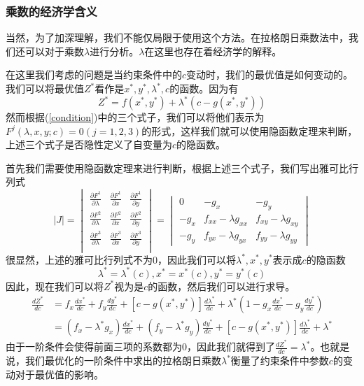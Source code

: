 \documentclass[UTF8,12pt]{ctexart}
\numberwithin{equation}{section} %
\numberwithin{figure}{section}
\numberwithin{table}{section}
\begin{document}
	\subsubsection{乘数的经济学含义}
	当然，为了加深理解，我们不能仅局限于使用这个方法。在拉格朗日乘数法中，我们还可以对于乘数$\lambda$进行分析。$\lambda$在这里也存在着经济学的解释。
	
	在这里我们考虑的问题是当约束条件中的$c$变动时，我们的最优值是如何变动的。我们可以将最优值$Z^*$看作是$x^*,y^*,\lambda^*,c$的函数。因为有
	\begin{equation}
		Z^* = f(x^*,y^*) + \lambda^*(c - g(x^*,y^*))
	\end{equation}
	然而根据(\ref{condition})中的三个式子，我们可以将他们表示为$F^{j}(\lambda,x,y;c) = 0(j = 1,2,3)$的形式，这样我们就可以使用隐函数定理来判断，上述三个式子是否隐性定义了自变量为$c$的隐函数。
	
	首先我们需要使用隐函数定理来进行判断，根据上述三个式子，我们写出雅可比行列式
	\begin{equation}
		|J|
		=
		\begin{vmatrix}
			\frac{\partial F^1}{\partial \lambda} & \frac{\partial F^1}{\partial x} & \frac{\partial F^1}{\partial y} \\
			\frac{\partial F^2}{\partial \lambda} & \frac{\partial F^2}{\partial x} & \frac{\partial F^2}{\partial y} \\
			\frac{\partial F^3}{\partial \lambda} & \frac{\partial F^3}{\partial x} & \frac{\partial F^3}{\partial y} \\
		\end{vmatrix}
		=
		\begin{vmatrix}
			0 & -g_x & -g_y \\
			-g_x  & f_{xx} - \lambda g_{xx} & f_{xy} - \lambda g_{xy} \\
			-g_y  & f_{yx} - \lambda g_{yx} & f_{yy} - \lambda g_{yy}
		\end{vmatrix}
	\end{equation}
	很显然，上述的雅可比行列式不为0，因此我们可以将$\lambda^*,x^*,y^*$表示成$c$的隐函数
	\begin{equation}
		\lambda^* = \lambda^*(c), x^* = x^*(c), y^* = y^*(c)
	\end{equation}
	因此，现在我们可以将$Z^*$视为是$c$的函数，然后我们可以进行求导。
	\begin{equation}
		\begin{aligned}
			\frac{dZ^*}{dc} &= f_x \frac{dx^*}{dc} + f_y \frac{dy^*}{dc} + [c - g(x^*,y^*)]\frac{d\lambda^*}{dc} + \lambda^*(1 - g_x\frac{dx^*}{dc} - g_y\frac{dy^*}{dc}) \\
			&=(f_x - \lambda^* g_x)\frac{dx^*}{dc} + (f_y - \lambda^* g_y)\frac{dy^*}{dc} + [c - g(x^*,y^*)]\frac{d\lambda^*}{dc} + \lambda^*
		\end{aligned}
	\end{equation}
	由于一阶条件会使得前面三项的系数都为0，因此我们就得到了$\frac{dZ^*}{dc} = \lambda^*$。也就是说，我们最优化的一阶条件中求出的拉格朗日乘数$\lambda^*$衡量了约束条件中参数$c$的变动对于最优值的影响。
	
\end{document}

